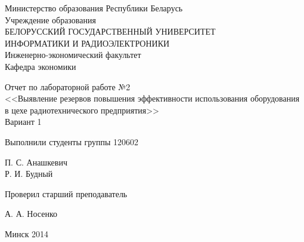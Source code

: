 \thispagestyle{empty}
\setlength{\parindent}{0ex} %

\begin{center}
  Министерство образования Республики Беларусь \\
  \smallskip
  Учреждение образования \\
  БЕЛОРУССКИЙ ГОСУДАРСТВЕННЫЙ УНИВЕРСИТЕТ \\
  ИНФОРМАТИКИ И РАДИОЭЛЕКТРОНИКИ \\
  \smallskip
  Инженерно-экономический факультет \\
  \smallskip
  Кафедра экономики
\end{center}

\vspace{40mm}

\begin{center}
  Отчет по лабораторной работе №2 \\
  <<Выявление резервов повышения эффективности использования оборудования
    в цехе радиотехнического предприятия>> \\
  Вариант 1
\end{center}

\vspace{60mm}

\begin{minipage}{.55\linewidth}

  Выполнили студенты группы 120602
  \bigskip

\end{minipage}
\hfill
\begin{minipage}{.4\linewidth}
  \begin{flushright}

    П. С. Анашкевич \\
    Р. И. Будный

  \end{flushright}
\end{minipage}

\vspace{10mm}

\begin{minipage}{.55\linewidth}

  Проверил старший преподаватель

\end{minipage}
\hfill
\begin{minipage}{.4\linewidth}
  \begin{flushright}

    А. А. Носенко

  \end{flushright}
\end{minipage}

\vspace{30mm}
\begin{center}

  Минск 2014

\end{center}

\setlength{\parindent}{5ex} %
